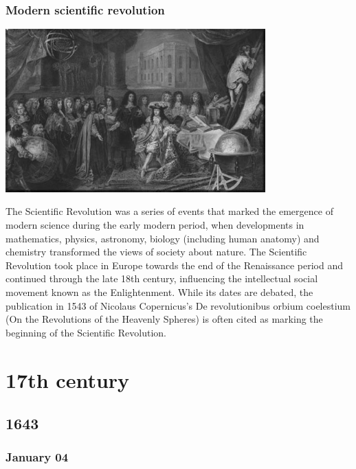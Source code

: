 \documentclass[11pt]{report}
\begin{document}
\section{Modern scientific revolution}
\vspace{2mm}\begin{center}\includegraphics[width=10cm]{./img/screvolution.jpg}\end{center}
The Scientific Revolution was a series of events that marked the emergence of modern science during the early modern period, when developments in mathematics, physics, astronomy, biology (including human anatomy) and chemistry transformed the views of society about nature. The Scientific Revolution took place in Europe towards the end of the Renaissance period and continued through the late 18th century, influencing the intellectual social movement known as the Enlightenment. While its dates are debated, the publication in 1543 of Nicolaus Copernicus's De revolutionibus orbium coelestium (On the Revolutions of the Heavenly Spheres) is often cited as marking the beginning of the Scientific Revolution.


		
\part{17th century}
\chapter{1643}
\section{January 04}
\end{document}
